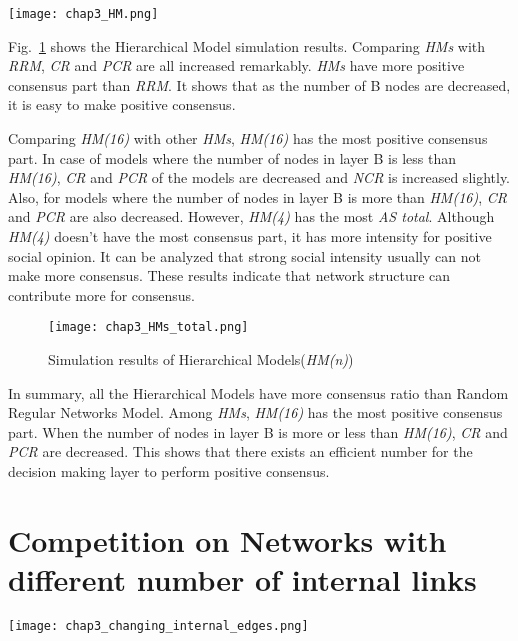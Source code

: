 \begin{figure*}[!htb]
	\centering
	\texttt{[image: chap3\_HM.png]}
	\caption{Competition on hierarchical model}
	\label{chap3_HM}
\end{figure*}

Fig.~\ref{chap3_HMs_total} shows the Hierarchical Model simulation results. Comparing \textit{HMs} with \textit{RRM}, \textit{CR} and \textit{PCR} are all increased remarkably. \textit{HMs} have more positive consensus part than \textit{RRM}. It shows that as the number of B nodes are decreased, it is easy to make positive consensus.



 Comparing \textit{HM(16)} with other \textit{HMs}, \textit{HM(16)} has the most positive consensus part. In case of models where the number of nodes in layer B is less than \textit{HM(16)},  \textit{CR} and \textit{PCR} of the models are decreased and \textit{NCR} is increased slightly. Also, for models where the number of nodes in layer B is more than \textit{HM(16)}, \textit{CR} and \textit{PCR} are also decreased. However, \textit{HM(4)} has the most \textit{AS total}. Although \textit{HM(4)} doesn't have the most consensus part, it has more intensity for positive social opinion. It can be analyzed that strong social intensity usually can not make more consensus. These results indicate that network structure can contribute more for consensus. 

\begin{figure}[!htb]
	\centering
	\texttt{[image: chap3\_HMs\_total.png]}
	\caption{Simulation results of Hierarchical Models(\textit{HM(n)})}
	\label{chap3_HMs_total}
\end{figure}

In summary, all the Hierarchical Models have more consensus ratio than Random Regular Networks Model. Among \textit{HMs}, \textit{HM(16)} has the most positive consensus part. When the number of nodes in layer B is more or less than \textit{HM(16)}, \textit{CR} and \textit{PCR} are decreased. This shows that there exists an efficient number for the decision making layer to perform positive consensus.  

\section{Competition on Networks with different number of internal links}

\begin{figure*}[!htb]
	\centering
	\texttt{[image: chap3\_changing\_internal\_edges.png]}
	\caption{Competition on interconnected networks with different internal edges}
	\label{chap3_changing_internal_edges}
\end{figure*}

